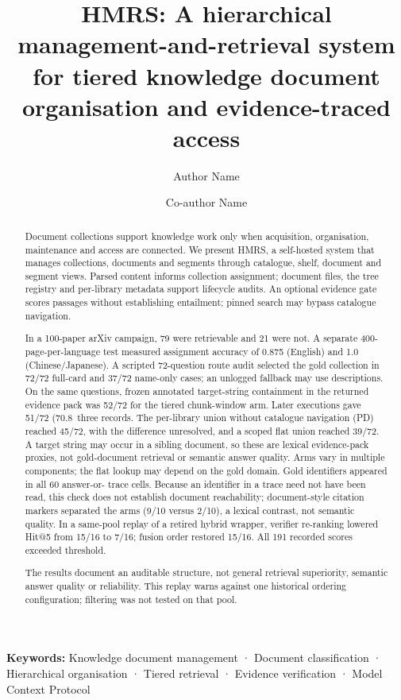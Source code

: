 \documentclass[11pt]{article}
\title{HMRS: A hierarchical management-and-retrieval system for tiered knowledge document organisation and evidence-traced access}
\author{Author Name\and Co-author Name}
\begin{document}
\maketitle
\begin{abstract}
Document collections support knowledge work only when acquisition,
organisation, maintenance and access are connected. We present HMRS, a
self-hosted system that manages collections, documents and segments through
catalogue, shelf, document and segment views. Parsed content informs collection
assignment; document files, the tree registry and per-library metadata support
lifecycle audits. An optional evidence gate scores passages without
establishing entailment; pinned search may bypass catalogue navigation.

In a 100-paper arXiv campaign, 79 were retrievable and 21 were not. A separate
400-page-per-language test measured assignment accuracy of 0.875 (English) and
1.0 (Chinese/Japanese). A scripted 72-question route audit selected the gold
collection in 72/72 full-card and 37/72 name-only cases; an unlogged fallback
may use descriptions. On the same questions, frozen annotated target-string
containment in the returned evidence pack was 52/72 for the tiered chunk-window
arm. Later executions gave 51/72 (70.8\
three records. The per-library union without catalogue navigation (PD) reached
45/72, with the difference unresolved, and a scoped flat union reached 39/72.
A target string may occur in a sibling document, so these are lexical
 evidence-pack proxies, not gold-document retrieval or semantic answer quality.
Arms
vary in multiple components; the flat lookup
may depend on the gold domain. Gold identifiers appeared in all 60 answer-or-
trace cells. Because an identifier in a trace need not have been read, this
check does not establish document reachability; document-style citation markers
separated the arms (9/10 versus 2/10), a lexical contrast, not semantic
quality. In a same-pool replay of a retired hybrid wrapper, verifier
re-ranking lowered Hit@5 from 15/16 to 7/16;
fusion order restored 15/16. All 191 recorded scores exceeded threshold.

The results document an auditable structure, not general retrieval superiority,
semantic answer quality or reliability. This replay warns against one
historical ordering configuration; filtering was not tested on that pool.
\end{abstract}

\noindent\textbf{Keywords:} Knowledge document management · Document classification · Hierarchical organisation · Tiered retrieval · Evidence verification · Model Context Protocol
\end{document}
